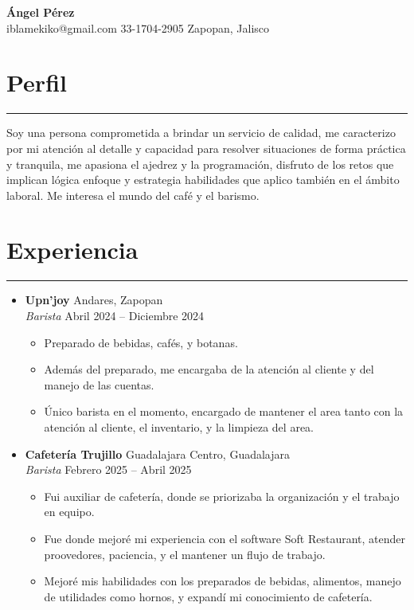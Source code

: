 \documentclass[10pt, a4paper]{article}
\begin{document}
\begin{center}
    {\Huge \bfseries Ángel Pérez} \\
    \vspace{0.2cm}
    iblamekiko@gmail.com \textbar{} 33-1704-2905 \textbar{} Zapopan, Jalisco
\end{center}

\vspace{0.5cm}

\section*{\bfseries Perfil}
\hrule
\vspace{0.2cm}

Soy una persona comprometida a brindar un servicio de calidad, me caracterizo por mi atención al detalle y capacidad para resolver situaciones de forma práctica y tranquila, me apasiona el ajedrez y la programación, disfruto de los retos que implican lógica enfoque y estrategia habilidades que aplico también en el ámbito laboral. 
Me interesa el mundo del café y el barismo.

\vspace{0.5cm}

\section*{\bfseries Experiencia}
\hrule
\vspace{0.2cm}
\begin{itemize}
    \item \textbf{Upn'joy} \hfill Andares, Zapopan \\
    \textit{Barista} \hfill Abril 2024 -- Diciembre 2024
    \begin{itemize}
        \item Preparado de bebidas, cafés, y botanas.
        \item Además del preparado, me encargaba de la atención al cliente y del manejo de las cuentas.
        \item Único barista en el momento, encargado de mantener el area tanto con la atención al cliente, el inventario, y la limpieza del area.
    \end{itemize}
    \vspace{0.2cm}
    \item \textbf{Cafetería Trujillo} \hfill Guadalajara Centro, Guadalajara \\
    \textit{Barista} \hfill Febrero 2025 -- Abril 2025
    \begin{itemize}
        \item Fui auxiliar de cafetería, donde se priorizaba la organización y el trabajo en equipo.
        \item Fue donde mejoré mi experiencia con el software Soft Restaurant, atender proovedores, paciencia, y el mantener un flujo de trabajo.
        \item Mejoré mis habilidades con los preparados de bebidas, alimentos, manejo de utilidades como hornos, y expandí mi conocimiento de cafetería.
    \end{itemize}
\end{itemize}
\end{document}
